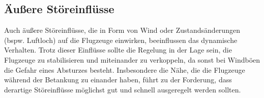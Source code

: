 \subsection{Äußere Störeinflüsse}
Auch äußere Störeinflüsse, die in Form von Wind oder Zustandsänderungen (bspw. Luftloch) auf die Flugzeuge einwirken, beeinflussen das dynamische Verhalten. Trotz dieser Einflüsse sollte die Regelung in der Lage sein, die Flugzeuge zu stabilisieren und miteinander zu verkoppeln, da sonst bei Windböen die Gefahr eines Absturzes besteht. Insbesondere die Nähe, die die Flugzeuge während der Betankung zu einander haben, führt zu der Forderung, dass derartige Störeinflüsse möglichst gut und schnell ausgeregelt werden sollten. 